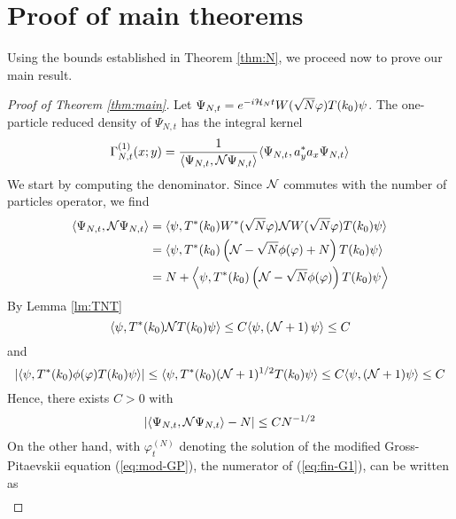 \documentclass[11pt,a4paper]{article}
\newcommand{\cH}{{\cal H}}
\newcommand{\cN}{{\cal N}}
\begin{document}
\section{Proof of main theorems}

Using the bounds established in Theorem \ref{thm:N}, we proceed now to prove our main result.

\begin{proof}[Proof of Theorem \ref{thm:main}]
Let $\Psi_{N,t} = e^{-i\cH_N t} W(\sqrt{N} \varphi) T(k_0) \psi$. The one-particle reduced density of $\Psi_{N,t}$ has the integral kernel
\begin{equation}\label{eq:fin-G1} \Gamma_{N,t}^{(1)} (x;y) = \frac{1}{\langle \Psi_{N,t} , \cN \Psi_{N,t} \rangle} \langle \Psi_{N,t} , a_y^* a_x \Psi_{N,t} \rangle \end{equation}
We start by computing the denominator. Since $\cN$ commutes with the number of particles operator, we find
\[ \begin{split} 
\langle \Psi_{N,t} , \cN \Psi_{N,t} \rangle = \; &\langle \psi,T^* (k_0) W^* (\sqrt{N} \varphi) \cN W (\sqrt{N} \varphi)  T(k_0) \psi\rangle  \\ = \; &\langle \psi, T^* (k_0) \left( \cN - \sqrt{N} \phi (\varphi) + N \right) T(k_0) \psi \rangle \\ = \; &N + \left\langle \psi,  T^* (k_0) \left(\cN - \sqrt{N} \phi(\varphi) \right) T(k_0) \psi \right\rangle\end{split} \]
By Lemma \ref{lm:TNT}
\[  \langle \psi , T^* (k_0) \cN T(k_0) \psi \rangle \leq C \langle \psi , (\cN+1) \, \psi \rangle \leq C \]
and 
\[ \left| \langle \psi , T^*(k_0) \phi (\varphi) T(k_0) \psi \rangle \right| \leq \langle \psi, T^* (k_0) (\cN+1)^{1/2} T(k_0) \psi \rangle \leq C \langle \psi , (\cN+1) \psi \rangle \leq C \]
Hence, there exists $C>0$ with
\begin{equation}\label{eq:fin-G2} \left| \langle \Psi_{N,t} , \cN \Psi_{N,t} \rangle - N \right| \leq C N^{-1/2} \end{equation}
On the other hand, with $\varphi^{(N)}_t$ denoting the solution of the modified Gross-Pitaevskii equation (\ref{eq:mod-GP}), the numerator of (\ref{eq:fin-G1}), can be written as  
\[ \begin{split} 

\end{split}\]
\end{proof}
\end{document}
